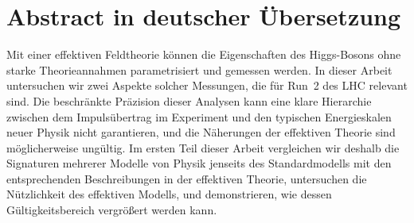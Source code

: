 


\chapter*{Abstract in deutscher \"{U}bersetzung}





Mit einer effektiven Feldtheorie k\"onnen die Eigenschaften des
Higgs-Bosons ohne starke Theorieannahmen parametrisiert und gemessen
werden. In dieser Arbeit untersuchen wir zwei Aspekte solcher
Messungen, die f\"ur Run~2 des LHC relevant sind. Die beschr\"ankte
Pr\"azision dieser Analysen kann eine klare Hierarchie zwischen dem
Impuls\"ubertrag im Experiment und den typischen Energieskalen neuer
Physik nicht garantieren, und die N\"aherungen der effektiven Theorie
sind m\"oglicherweise ung\"ultig. Im ersten Teil dieser Arbeit
vergleichen wir deshalb die Signaturen mehrerer Modelle von Physik
jenseits des Standardmodells mit den entsprechenden Beschreibungen in
der effektiven Theorie, untersuchen die N\"utzlichkeit des effektiven
Modells, und demonstrieren, wie dessen G\"ultigkeitsbereich
vergr\"o\ss{}ert werden kann.

